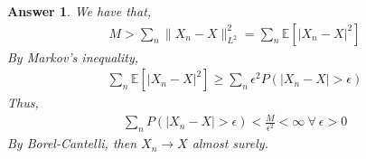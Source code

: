 \documentclass[12pt]{article}
\theoremstyle{colon}
\newtheorem*{answer}{Answer}
\begin{document}
\begin{answer}
  We have that,
  \begin{gather*}
    M > \sum_n \lVert X_n - X \rVert_{L^2}^2 = \sum_n \mathbb{E}[\lvert X_n - X \rvert^2]
  \end{gather*}
  By Markov's inequality,
  \begin{gather*}
    \sum_n \mathbb{E}[\lvert X_n - X \rvert^2] \geq \sum_n \epsilon^2 P(|X_n - X| > \epsilon)
  \end{gather*}
  Thus,
  \begin{gather*}
    \sum_n P(|X_n - X| > \epsilon) < \frac{M}{\epsilon^2} < \infty \ \forall \ \epsilon > 0
  \end{gather*}
  By Borel-Cantelli, then $X_n \rightarrow X$ almost surely.
\end{answer}
\end{document}
